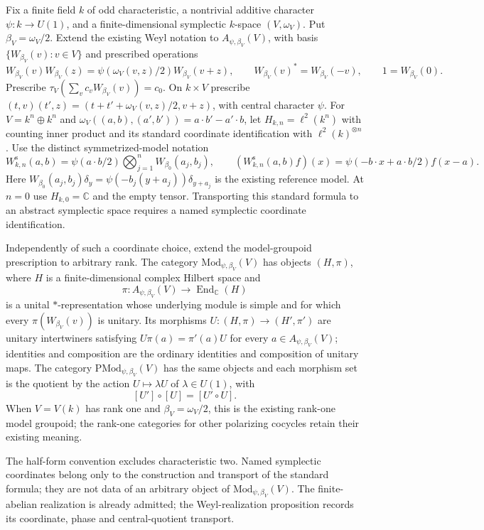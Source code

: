 \begin{definition}
Fix a finite field $k$ of odd characteristic, a nontrivial additive
character $\psi:k\to U(1)$, and a finite-dimensional symplectic
$k$-space $(V,\omega_V)$. Put $\beta_V=\omega_V/2$.
Extend the existing Weyl notation to $A_{\psi,\beta_V}(V)$, with basis
$\{W_{\beta_V}(v):v\in V\}$ and prescribed operations
\[
 W_{\beta_V}(v)W_{\beta_V}(z)
 =\psi(\omega_V(v,z)/2)W_{\beta_V}(v+z),\qquad
 W_{\beta_V}(v)^*=W_{\beta_V}(-v),\qquad 1=W_{\beta_V}(0).
\]
Prescribe $\tau_V(\sum_v c_vW_{\beta_V}(v))=c_0$. On $k\times V$
prescribe $(t,v)(t',z)=(t+t'+\omega_V(v,z)/2,v+z)$, with central
character $\psi$.
For $V=k^n\oplus k^n$ and
$\omega_V((a,b),(a',b'))=a\cdot b'-a'\cdot b$, let
$H_{k,n}=\ell^2(k^n)$ with counting inner product and its standard
coordinate identification with $\ell^2(k)^{\otimes n}$.
Use the distinct symmetrized-model notation
\[
 W^{\mathrm s}_{k,n}(a,b)
 =\psi(a\cdot b/2)\bigotimes_{j=1}^n W_{\beta_0}(a_j,b_j),
 \qquad
 (W^{\mathrm s}_{k,n}(a,b)f)(x)
 =\psi(-b\cdot x+a\cdot b/2)f(x-a).
\]
Here $W_{\beta_0}(a_j,b_j)\delta_y
=\psi(-b_j(y+a_j))\delta_{y+a_j}$ is the existing reference model.
At $n=0$ use $H_{k,0}=\mathbb C$ and the empty tensor.  Transporting this
standard formula to an abstract symplectic space requires a named
symplectic coordinate identification.

Independently of such a coordinate choice, extend the model-groupoid
prescription to arbitrary rank.  The category
$\mathrm{Mod}_{\psi,\beta_V}(V)$ has objects $(H,\pi)$, where $H$ is a
finite-dimensional complex Hilbert space and
\[
 \pi:A_{\psi,\beta_V}(V)\longrightarrow\operatorname{End}_{\mathbb C}(H)
\]
is a unital $*$-representation whose underlying module is simple and for
which every $\pi(W_{\beta_V}(v))$ is unitary.  Its morphisms
$U:(H,\pi)\to(H',\pi')$ are unitary intertwiners satisfying
$U\pi(a)=\pi'(a)U$ for every $a\in A_{\psi,\beta_V}(V)$; identities and
composition are the ordinary identities and composition of unitary maps.
The category $\mathrm{PMod}_{\psi,\beta_V}(V)$ has the same objects and
each morphism set is the quotient by the action
$U\mapsto\lambda U$ of $\lambda\in U(1)$, with
\[
 [U']\circ[U]=[U'\circ U].
\]
When $V=V(k)$ has rank one and $\beta_V=\omega_V/2$, this is the existing
rank-one model groupoid; the rank-one categories for other polarizing
cocycles retain their existing meaning.
\end{definition}
\begin{scope}
The half-form convention excludes characteristic two. Named symplectic
coordinates belong only to the construction and transport of the standard
formula; they are not data of an arbitrary object of
$\mathrm{Mod}_{\psi,\beta_V}(V)$. The finite-abelian realization is already
admitted; the Weyl-realization proposition records its coordinate, phase
and central-quotient transport.
\end{scope}

